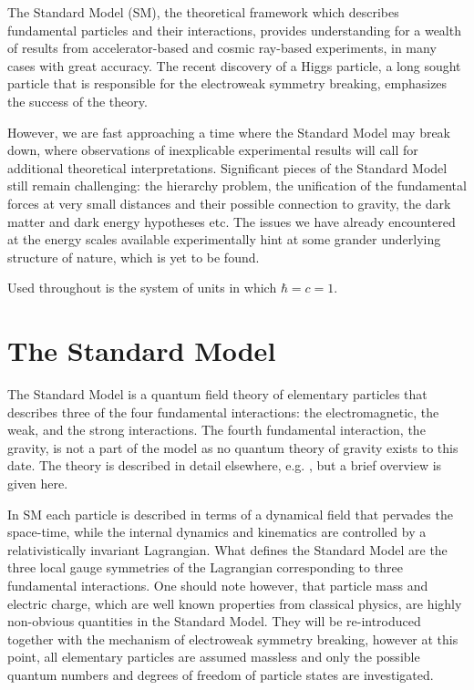 The Standard Model (SM), the theoretical framework which describes fundamental particles
and their interactions, provides understanding for a wealth of results from accelerator-based
and cosmic ray-based experiments, in many cases with great accuracy.
The recent discovery of a Higgs particle, a long sought particle that is responsible for
the electroweak symmetry 
breaking, emphasizes the success of the theory.

However, we are fast approaching a time where the Standard Model may break down,
where observations of inexplicable experimental results will call for additional theoretical 
interpretations. Significant pieces of the Standard Model still remain challenging: the hierarchy
problem, the unification of the fundamental forces at very small distances and their possible
connection to gravity, the dark matter and dark energy hypotheses etc.
The issues we have already encountered at the energy scales available experimentally 
hint at some grander underlying structure of nature, which is yet to be found.


Used throughout is the system of units in which $\hbar=c=1$.


\section{The Standard Model}

The Standard Model is a quantum field theory of elementary particles that describes 
three of the four fundamental interactions: 
the electromagnetic, the weak, and the strong interactions. The fourth fundamental
interaction, the gravity, 
is not a part of the model as no quantum theory of gravity exists to this date. 
The theory is described in detail elsewhere, e.g. \cite{Tully:1417476}, 
but a brief overview is given here.

In SM each particle is described
in terms of a dynamical field that pervades the space-time, while the internal dynamics 
and kinematics are controlled by a relativistically invariant Lagrangian.
What defines the Standard Model are the three local gauge symmetries of the Lagrangian
corresponding to three fundamental interactions.
One should note however, that particle mass and electric charge, 
which are well known properties from 
classical physics, are highly non-obvious quantities in the Standard Model. They
will be re-introduced together with the mechanism of electroweak symmetry breaking, however
at this point,
all elementary particles are assumed massless and only the possible quantum numbers
and degrees of freedom of particle states are investigated.

